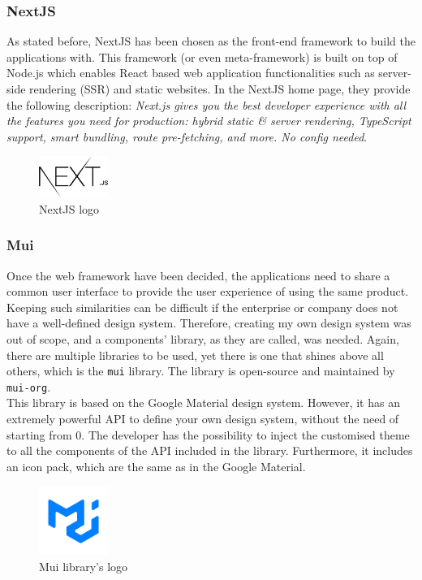 \documentclass[a4paper, 12pt, oneside]{book}
\begin{document}
\subsubsection{NextJS}
As stated before, NextJS has been chosen as the front-end framework to build the applications with. This framework (or even meta-framework) is built on top of Node.js which enables React based web application functionalities such as server-side rendering (SSR) and static websites. In the NextJS home page, they provide the following description: \emph{Next.js gives you the best developer experience with all the features you need for production: hybrid static \& server rendering, TypeScript support, smart bundling, route pre-fetching, and more. No config needed}.
\begin{figure}[H]
	\centering
	\includegraphics[width=0.2\textwidth]{assets/next-logo.png}
	\caption{NextJS logo}
\end{figure}
\subsubsection{Mui}
Once the web framework have been decided, the applications need to share a common user interface to provide the user experience of using the same product. Keeping such similarities can be difficult if the enterprise or company does not have a well-defined design system. Therefore, creating my own design system was out of scope, and a components' library, as they are called, was needed. Again, there are multiple libraries to be used, yet there is one that shines above all others, which is the \texttt{mui} library. The library is open-source and maintained by \texttt{mui-org}.
\\[8pt]
This library is based on the Google Material design system. However, it has an extremely powerful API to define your own design system, without the need of starting from 0. The developer has the possibility to inject the customised theme to all the components of the API included in the library. Furthermore, it includes an icon pack, which are the same as in the Google Material.
\begin{figure}[H]
	\centering
	\includegraphics[width=0.2\textwidth]{assets/mui-logo.png}
	\caption{Mui library's logo}
\end{figure}
\end{document}
